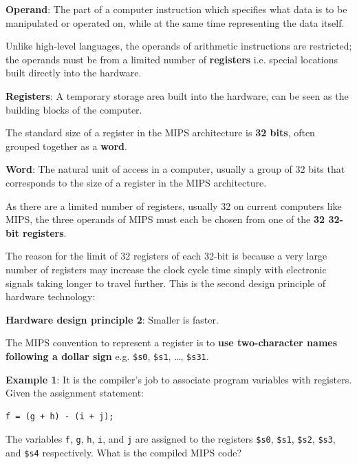 \documentclass[10pt,a4paper]{article}
\begin{document}
\begin{tcolorbox}[breakable,colback=white]
\textbf{Operand}: The part of a computer instruction which specifies what data is to be manipulated or operated on, while at the same time representing the data itself.
\end{tcolorbox}

Unlike high-level languages, the operands of arithmetic instructions are restricted; the operands
must be from a limited number of \textbf{registers} i.e. special locations built directly into the
hardware.

\begin{tcolorbox}[breakable,colback=white]
\textbf{Registers}: A temporary storage area built into the hardware, can be seen as the building
blocks of the computer.
\end{tcolorbox}

The standard size of a register in the MIPS architecture is \textbf{32 bits}, often grouped together as a
\textbf{word}. 
\begin{tcolorbox}[breakable,colback=white]
\textbf{Word}:  The natural unit of access in a computer, usually a group of 32 bits that
corresponds to the size of a register in the MIPS architecture.
\end{tcolorbox}

As there are a limited number of registers, usually 32 on current computers like MIPS, the three
operands of MIPS must each be chosen from one of the \textbf{32 32-bit registers}. 

The reason for the limit of 32 registers of each 32-bit is because a very large number of registers
may increase the clock cycle time simply with electronic signals taking longer to travel further.
This is the second design principle of hardware technology:
\begin{tcolorbox}[breakable,colback=white]
    \textbf{Hardware design principle 2}: Smaller is faster.
\end{tcolorbox}

The MIPS convention to represent a register is to \textbf{use two-character names following a dollar
sign} e.g. \texttt{\$s0}, \texttt{\$s1}, \dots, \texttt{\$s31}.

\textbf{Example 1}: It is the compiler’s job to associate program variables with registers. Given
the assignment statement:
\begin{lstlisting}[numbers=none]
    f = (g + h) - (i + j);
\end{lstlisting}
The variables \texttt{f}, \texttt{g}, \texttt{h}, \texttt{i}, and \texttt{j} are assigned to the
registers \texttt{\$s0}, \texttt{\$s1}, \texttt{\$s2}, \texttt{\$s3}, and \texttt{\$s4}
respectively. What is the compiled MIPS code?
\end{document}
